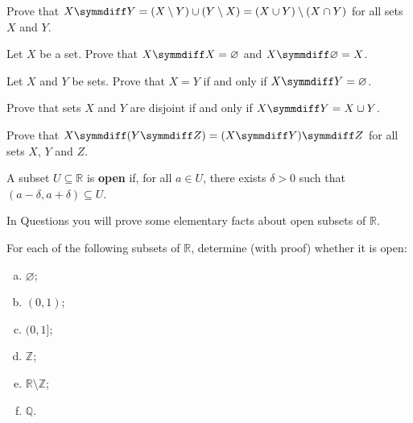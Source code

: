 \begin{chapex}
\label{cqSymmetricDifferenceBegin}
Prove that $X \symmdiff Y = (X \setminus Y) \cup (Y \setminus X) = (X \cup Y) \setminus (X \cap Y)$ for all sets $X$ and $Y$.
\end{chapex}

\begin{chapex}
Let $X$ be a set. Prove that $X \symmdiff X = \varnothing$ and $X \symmdiff \varnothing = X$.
\end{chapex}

\begin{chapex}
Let $X$ and $Y$ be sets. Prove that $X = Y$ if and only if $X \symmdiff Y = \varnothing$.
\end{chapex}

\begin{chapex}
Prove that sets $X$ and $Y$ are disjoint if and only if $X \symmdiff Y = X \cup Y$.
\end{chapex}

\begin{chapex}
Prove that $X \symmdiff (Y \symmdiff Z) = (X \symmdiff Y) \symmdiff Z$ for all sets $X$, $Y$ and $Z$.
\end{chapex}

\begin{definition}
\label{defOpenSubsetOfR}
A subset $U \subseteq \mathbb{R}$ is \textbf{open} if, for all $a \in U$, there exists $\delta > 0$ such that $(a-\delta, a+\delta) \subseteq U$.
\end{definition}

In Questions  you will prove some elementary facts about open subsets of $\mathbb{R}$.

\begin{chapex}
\label{cqOpenSubsetsOfRBegin}
For each of the following subsets of $\mathbb{R}$, determine (with proof) whether it is open:
\begin{multicols}{3}
\begin{enumerate}[(a)]
\item $\varnothing$;
\item $(0,1)$;
\item $(0,1]$;
\item $\mathbb{Z}$;
\item $\mathbb{R} \setminus \mathbb{Z}$;
\item $\mathbb{Q}$.
\end{enumerate}
\end{multicols}
\end{chapex}


